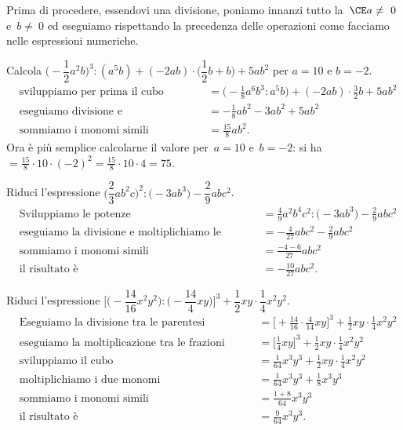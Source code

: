 Prima di procedere, essendovi una divisione, poniamo innanzi tutto
la~$\CE a \neq~0$ e~$b \neq~0$ ed eseguiamo rispettando la precedenza
delle operazioni come facciamo nelle espressioni numeriche.
\begin{exrig}
 \begin{esempio}
Calcola $\bigg(-{\dfrac{1}{2}}a^{2}b\bigg)^{3}:(a^{5}b)+(-2ab)\cdot\bigg(\dfrac{1}{2}b+b\bigg)+5ab^{2}$ per $a=10$ e $b=-2$.
 \begin{align*}
 &\text{sviluppiamo per prima il cubo} && = \bigg(-{\frac{1}{8}}a^{6}b^{3}:a^{5}b\bigg)+(-2ab)\cdot{\frac{3}{2}}b+5ab^{2} \\
 &\text{eseguiamo divisione e moltiplicazione} && = -{\frac{1}{8}}ab^{2}-3ab^{2}+5ab^{2}\\
 &\text{sommiamo i monomi simili} && = \frac{15}{8}ab^{2}.
 \end{align*}
 Ora è più semplice calcolarne il valore per~$a=10$ e~$b=-2$: si
 ha~$=\frac{15}{8}\cdot 10\cdot(-2)^{2}=\frac{15}{8}\cdot 10\cdot 4=75$.
 \end{esempio}

 \begin{esempio}
Riduci l'espressione $\bigg(\dfrac{2}{3}ab^{2}c\bigg)^{2}:\big(-3ab^{3}\big)-\dfrac{2}{9}abc^{2}$.
 \begin{align*}
 &\text{Sviluppiamo le potenze} && = \frac{4}{9}a^{2}b^{4}c^{2}:\big(-3ab^{3}\big)-\frac{2}{9}abc^{2}\\
 &\text{eseguiamo la divisione e moltiplichiamo le frazioni} && = -{\frac{4}{27}}abc^{2}-\frac{2}{9}abc^{2}\\
 &\text{sommiamo i monomi simili} && = \frac{-4-6}{27}abc^{2}\\
 &\text{il risultato è} && = -{\frac{10}{27}}abc^{2}.
 \end{align*}
 \end{esempio}

 \begin{esempio}
Riduci l'espressione $\Bigg[\bigg(-{\dfrac{14}{16}}x^{2}y^{2}\bigg):\bigg(-{\dfrac{14}{4}}xy\bigg)\Bigg]^{3}+\dfrac{1}{2}xy\cdot{\dfrac{1}{4}}x^{2}y^{2}$.
 \begin{align*}
 &\text{Eseguiamo la divisione tra le parentesi quadre} && = \bigg[+{\frac{14}{16}}\cdot{\frac{4}{14}}xy\bigg]^{3}+\frac{1}{2}xy\cdot {\frac{1}{4}}x^{2}y^{2}\\
 &\text{eseguiamo la moltiplicazione tra le frazioni} && = \bigg[\frac{1}{4}xy\bigg]^{3}+\frac{1}{2}xy\cdot{\frac{1}{4}}x^{2}y^{2}\\
 &\text{sviluppiamo il cubo} && = \frac{1}{64}x^{3}y^{3}+\frac{1}{2}xy\cdot {\frac{1}{4}}x^{2}y^{2}\\
 &\text{moltiplichiamo i due monomi} && = \frac{1}{64}x^{3}y^{3}+\frac{1}{8}x^{3}y^{3}\\
 &\text{sommiamo i monomi simili} && = \frac{1+8}{64}x^{3}y^{3}\\
 &\text{il risultato è} && = \frac{9}{64}x^{3}y^{3}.
\end{align*}
 \end{esempio}
\end{exrig}

